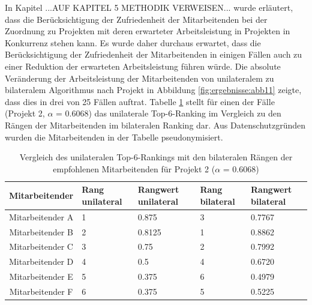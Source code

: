 In Kapitel ...AUF KAPITEL 5 METHODIK VERWEISEN...  wurde erläutert, dass die Berücksichtigung der Zufriedenheit der Mitarbeitenden bei der Zuordnung zu Projekten mit deren erwarteter Arbeitsleistung in Projekten in Konkurrenz stehen kann.
Es wurde daher durchaus erwartet, dass die Berücksichtigung der Zufriedenheit der Mitarbeitenden in einigen Fällen auch zu einer Reduktion der erwarteten Arbeitsleistung führen würde.
Die absolute Veränderung der Arbeitsleistung der Mitarbeitenden von unilateralem zu bilateralem Algorithmus nach Projekt in Abbildung \ref{fig:ergebnisse:abb11} zeigte, dass dies in drei von 25 Fällen auftrat.
Tabelle \ref{tab:diskussion:tab2} stellt für einen der Fälle (Projekt 2, $\alpha$ = 0.6068) das unilaterale Top-6-Ranking im Vergleich zu den Rängen der Mitarbeitenden im bilateralen Ranking dar.
Aus Datenschutzgründen wurden die Mitarbeitenden in der Tabelle pseudonymisiert.

\begin{table}[htbp]
    \begin{center}
    \begin{tabular}{c|p{0.7in}|p{0.7in}|p{0.7in}|p{0.7in}}
    {\textbf{Mitarbeitender}} & {\textbf{Rang unilateral}} & {\textbf{Rangwert unilateral}} & {\textbf{Rang bilateral}} & {\textbf{Rangwert bilateral}} \\
    \hline
	Mitarbeitender A & \hfil1 & \hfil0.875 & \hfil3 & \hfil0.7767 \\
    \hline
    Mitarbeitender B & \hfil2 & \hfil0.8125 & \hfil1 & \hfil0.8862 \\
    \hline
	Mitarbeitender C & \hfil3 & \hfil0.75 & \hfil2 & \hfil0.7992 \\
    \hline
	Mitarbeitender D & \hfil4 & \hfil0.5 & \hfil4 & \hfil0.6720 \\
    \hline
	Mitarbeitender E & \hfil5 & \hfil0.375 & \hfil6 & \hfil0.4979 \\
    \hline
	Mitarbeitender F & \hfil6 & \hfil0.375 & \hfil5 & \hfil0.5225 \\
    \end{tabular}
    \end{center}
    \caption[Vergleich des unilateralen Top-6-Rankings mit den bilateralen Rängen der empfohlenen Mitarbeitenden für Projekt 2 ($\alpha$ = 0.6068)]{Vergleich des unilateralen Top-6-Rankings mit den bilateralen Rängen der empfohlenen Mitarbeitenden für Projekt 2 ($\alpha$ = 0.6068)}
	\label{tab:diskussion:tab2}
\end{table}

